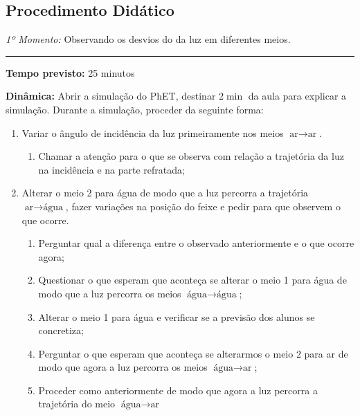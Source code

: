         
        \subsection*{Procedimento Didático}
        \vspace*{40pt}
        \noindent \emph{1º Momento:} Observando os desvios do da luz em diferentes meios.
        \par\noindent\rule{.3\textwidth}{.5pt}  
        \par\noindent \textbf{Tempo previsto:} 25 minutos

        \noindent \textbf{Dinâmica:} Abrir a simulação do PhET, destinar $2\min$ da aula para explicar a simulação. Durante a simulação, proceder da seguinte forma:
        \begin{enumerate}
            \item Variar o ângulo de incidência da luz primeiramente nos meios $\text{ar}\to\text{ar}$.
            \begin{enumerate}
                \item Chamar a atenção para o que se observa com relação a trajetória da luz na incidência e na parte refratada;
            \end{enumerate}
            \item Alterar o meio 2 para água de modo que a luz percorra a trajetória $\text{ar}\to\text{água}$, fazer variações na posição do feixe e pedir para que observem o que ocorre.
            \begin{enumerate}
                \item Perguntar qual a diferença entre o observado anteriormente e o que ocorre agora;
                \item Questionar o que esperam que aconteça se alterar o meio 1 para água de modo que a luz percorra os meios $\text{água}\to\text{água}$;
                \item Alterar o meio 1 para água e verificar se a previsão dos alunos se concretiza;
                \item Perguntar o que esperam que aconteça se alterarmos o meio 2 para ar de modo que agora a luz percorra os meios $\text{água}\to\text{ar}$;
                \item Proceder como anteriormente de modo que agora a luz percorra a trajetória do meio $\text{água}\to\text{ar}$
            \end{enumerate}
        \end{enumerate}
        
